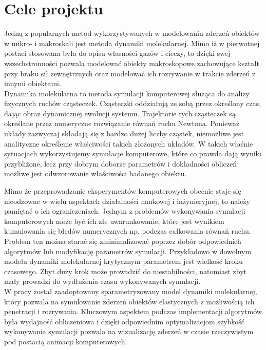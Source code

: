 \documentclass[12pt, letterpaper]{report}
\begin{document}
    \section{Cele projektu}
    Jedną z popularnych metod wykorzystywanych w modelowaniu zderzeń obiektów w mikro- i makroskali jest 
    metoda dynamiki molekularnej. Mimo iż w pierwotnej postaci stosowana była do opisu własności gazów i 
    cieczy, to dzięki swej wszechstronności pozwala modelować obiekty makroskopowe zachowujące kształt 
    przy braku sił zewnętrznych oraz modelować ich rozrywanie w trakcie zderzeń z innymi obiektami. \\

    Dynamika molekularna to metoda symulacji komputerowej służąca do analizy fizycznych ruchów cząsteczek. 
    Cząsteczki oddziałują ze sobą przez określony czas, dając obraz dynamicznej ewolucji systemu. 
    Trajektorie tych cząsteczek są określane przez numeryczne rozwiązanie równań ruchu Newtona. 
    Ponieważ układy zazwyczaj składają się z bardzo dużej liczby cząstek, niemożliwe jest analityczne 
    określenie właściwości takich złożonych układów. W takich właśnie sytuacjach wykorzystujemy 
    symulacje komputerowe, które co prawda dają wyniki przybliżone, lecz przy dobrym doborze 
    parametrów i dokładności obliczeń możliwe jest odwzorowanie właściwości badanego obiektu. 
    
    Mimo że przeprowadzanie eksperymentów komputerowych obecnie staje się nieodzowne w wielu 
    aspektach działalności naukowej i inżynieryjnej, to należy pamiętać o ich ograniczeniach. 
    Jednym z problemów wykonywania symulacji komputerowych może być ich złe uwarunkowanie, które 
    jest wynikiem kumulowania się błędów numerycznych np. podczas całkowania równań ruchu. 
    Problem ten można starać się zminimalizować poprzez dobór odpowiednich algorytmów lub 
    modyfikację parametrów symulacji. 
    Przykładowo w dowolnym modelu dynamiki molekularnej krytycznym parametrem jest wielkość 
    kroku czasowego. Zbyt duży krok może prowadzić do niestabilności, natomiast zbyt mały 
    prowadzi do wydłużenia czasu wykonywanych symulacji. \\
    
    W pracy został zaadoptowany sparametryzowany model dynamiki molekularnej, który pozwala na 
    symulowanie zderzeń obiektów elastycznych z możliwością ich penetracji i rozrywania. Kluczowym 
    aspektem podczas implementacji algorytmów była wydajność obliczeniowa i dzięki odpowiednim 
    optymalizacjom szybkość wykonywania symulacji pozwala na wizualizację zderzeń w czasie rzeczywistym 
    pod postacią animacji komputerowych.
    
\end{document}
